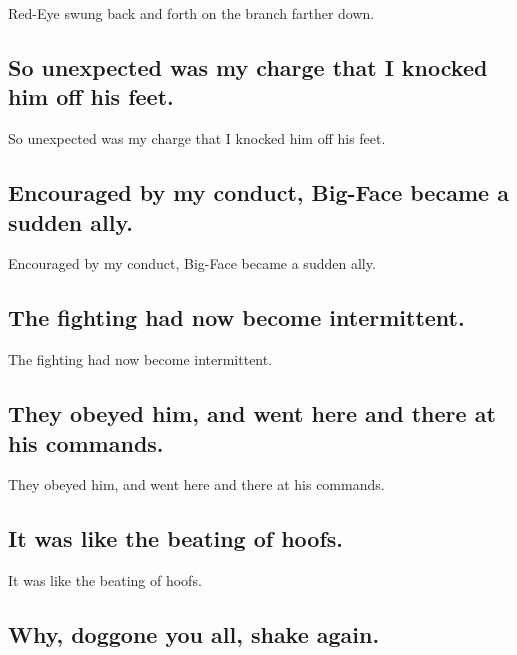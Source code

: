 \documentclass[]{article}
\begin{document}
Red-Eye swung back and forth on the branch farther down.

\hypertarget{so-unexpected-was-my-charge-that-i-knocked-him-off-his-feet.}{%
\subsection{So unexpected was my charge that I knocked him off his
feet.}\label{so-unexpected-was-my-charge-that-i-knocked-him-off-his-feet.}}

So unexpected was my charge that I knocked him off his feet.

\hypertarget{encouraged-by-my-conduct-big-face-became-a-sudden-ally.}{%
\subsection{Encouraged by my conduct, Big-Face became a sudden
ally.}\label{encouraged-by-my-conduct-big-face-became-a-sudden-ally.}}

Encouraged by my conduct, Big-Face became a sudden ally.

\hypertarget{the-fighting-had-now-become-intermittent.}{%
\subsection{The fighting had now become
intermittent.}\label{the-fighting-had-now-become-intermittent.}}

The fighting had now become intermittent.

\hypertarget{they-obeyed-him-and-went-here-and-there-at-his-commands.}{%
\subsection{They obeyed him, and went here and there at his
commands.}\label{they-obeyed-him-and-went-here-and-there-at-his-commands.}}

They obeyed him, and went here and there at his commands.

\hypertarget{it-was-like-the-beating-of-hoofs.}{%
\subsection{It was like the beating of
hoofs.}\label{it-was-like-the-beating-of-hoofs.}}

It was like the beating of hoofs.

\hypertarget{why-doggone-you-all-shake-again.}{%
\subsection{Why, doggone you all, shake
again.}\label{why-doggone-you-all-shake-again.}}
\end{document}
